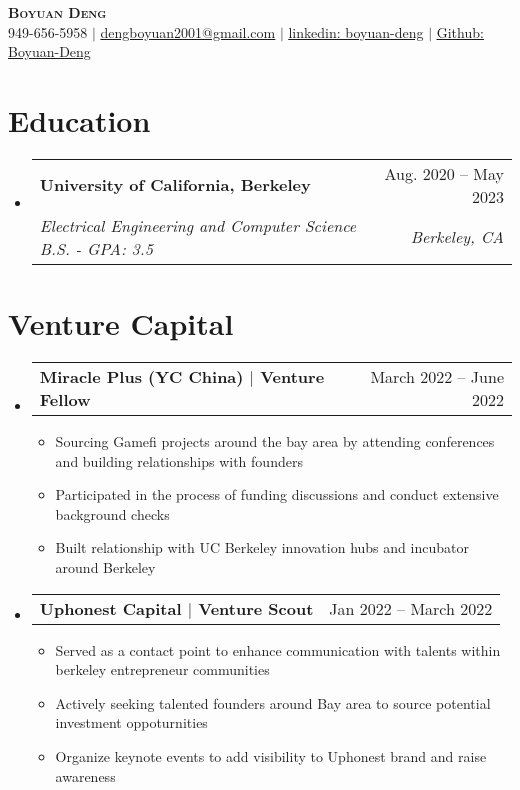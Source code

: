 \documentclass[letterpaper,11pt]{article}
\makeatletter
\newcommand{\resumeItem}[1]{
  \item\small{
    {#1 \vspace{-2pt}}
  }
}
\newcommand{\resumeSubheading}[4]{
  \vspace{-2pt}\item
    \begin{tabular*}{0.97\textwidth}[t]{l@{\extracolsep{\fill}}r}
      \textbf{#1} & #2 \\
      \textit{\small#3} & \textit{\small #4} \\
    \end{tabular*}\vspace{-7pt}
}
\newcommand{\resumeSubheadingTwo}[2]{
    \item
    \begin{tabular*}{0.97\textwidth}{l@{\extracolsep{\fill}}r}
      \textbf{#1} & #2 \\
    \end{tabular*}\vspace{-7pt}
}
\newcommand{\resumeSubHeadingListStart}{\begin{itemize}[leftmargin=0.15in, label={}]}
\newcommand{\resumeSubHeadingListEnd}{\end{itemize}}
\newcommand{\resumeItemListStart}{\begin{itemize}}
\newcommand{\resumeItemListEnd}{\end{itemize}\vspace{-5pt}}
\makeatother
\begin{document}

\begin{center}
    \textbf{\Huge \scshape Boyuan Deng} \\ \vspace{2.5pt}
    \small 949-656-5958 $|$ \href{mailto:dengboyuan2001@gmail.com}{\underline{dengboyuan2001@gmail.com}} $|$ 
    \href{https://linkedin.com/in/boyuan-deng}{\underline{linkedin: boyuan-deng}} $|$
    \href{https://github.com/Boyuan-Deng}{\underline{Github: Boyuan-Deng}}
\end{center}


\section{Education}
  \resumeSubHeadingListStart
    \resumeSubheading
      {University of California, Berkeley}{Aug. 2020 -- May 2023}
      {Electrical Engineering and Computer Science B.S. - GPA: 3.5}{Berkeley, CA}
  \resumeSubHeadingListEnd




\section{Venture Capital}
    \resumeSubHeadingListStart
      \resumeSubheadingTwo
      {Miracle Plus (YC China) $|$ \small{Venture Fellow}}{March 2022 -- June 2022}
          \resumeItemListStart
            \resumeItem{Sourcing Gamefi projects around the bay area by attending conferences and building relationships with founders}
            \resumeItem{Participated in the process of funding discussions and conduct extensive background checks}
            \resumeItem{Built relationship with UC Berkeley innovation hubs and incubator around Berkeley}
          \resumeItemListEnd
      \resumeSubheadingTwo
      {Uphonest Capital $|$ \small{Venture Scout}}{Jan 2022 -- March 2022}
          \resumeItemListStart
            \resumeItem{Served as a contact point to enhance communication with talents within berkeley entrepreneur communities}
            \resumeItem{Actively seeking talented founders around Bay area to source potential investment oppoturnities}
            \resumeItem{Organize keynote events to add visibility to Uphonest brand and raise awareness}
          \resumeItemListEnd
    \resumeSubHeadingListEnd
\end{document}
